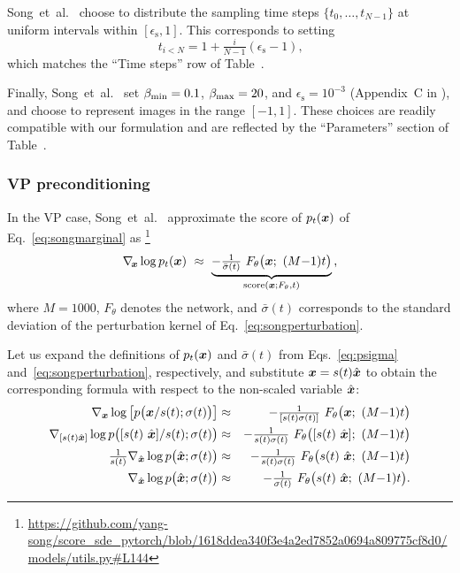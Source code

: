 Song~et~al.~\cite{Song2021sde} choose to distribute the sampling time steps $\{t_0, \dots, t_{N-1}\}$ at uniform intervals within $[\epsilon_\text{s}, 1]$.
This corresponds to setting
\begin{equation}
  t_{i<N} = 1 + \tfrac{i}{N-1}(\epsilon_\text{s} - 1)
  \text{,}
\end{equation}
which matches the ``Time steps'' row of Table~.

Finally, Song~et~al.~\cite{Song2021sde} set $\beta_\text{min} = 0.1$, $\beta_\text{max} = 20$, and $\epsilon_\text{s} = 10^{-3}$ (Appendix~C in \cite{Song2021sde}), and choose to represent images in the range $[-1, 1]$.
These choices are readily compatible with our formulation and are reflected by the ``Parameters'' section of Table~.

\subsubsection{VP preconditioning}

In the VP case, Song~et~al.~\cite{Song2021sde} approximate the score of $p_t(\boldsymbol{x})$ of Eq.~\ref{eq:songmarginal} as%
\footnote{\tiny\url{https://github.com/yang-song/score\_sde\_pytorch/blob/1618ddea340f3e4a2ed7852a0694a809775cf8d0/models/utils.py\#L144}}
\begin{equation}
  \nabla_{\hspace{-0.5mm}\boldsymbol{x}} \log p_t(\boldsymbol{x}) ~\approx~ \underbrace{{-}\tfrac{1}{\bar\sigma(t)} ~F_\theta\big( \boldsymbol{x}; ~(M{-}1)t \big)}_{\operatorname{score}(\boldsymbol{x}; F_\theta, t)}
  \label{eq:vpprecondorig}
  \text{,}
\end{equation}
where $M = 1000$, $F_\theta$ denotes the network, and $\bar\sigma(t)$ corresponds to the standard deviation of the perturbation kernel of Eq.~\ref{eq:songperturbation}.

Let us expand the definitions of $p_t(\boldsymbol{x})$ and $\bar\sigma(t)$ from Eqs.~\ref{eq:psigma} and~\ref{eq:songperturbation}, respectively, and substitute $\boldsymbol{x} = s(t) \hat{\boldsymbol{x}}$ to obtain the corresponding formula with respect to the non-scaled variable $\hat{\boldsymbol{x}}$:
\begin{eqnarray}
  \nabla_{\boldsymbol{x}} \log \big[ p\big( \boldsymbol{x} / s(t); \sigma(t) \big) \big] &\approx& {-}\tfrac{1}{[s(t) \sigma(t)]} ~F_\theta\big( \boldsymbol{x}; ~(M{-}1)t \big) \\
  \nabla_{[s(t) \hat{\boldsymbol{x}}]} \log p\big( [s(t) ~\hat{\boldsymbol{x}}] / s(t); \sigma(t) \big) &\approx& {-}\tfrac{1}{s(t) \sigma(t)} ~F_\theta\big( [s(t) ~\hat{\boldsymbol{x}}]; ~(M{-}1)t \big) \\
  \tfrac{1}{s(t)} \nabla_{\hat{\boldsymbol{x}}} \log p\big( \hat{\boldsymbol{x}}; \sigma(t) \big) &\approx& {-}\tfrac{1}{s(t) \sigma(t)} ~F_\theta\big( s(t) ~\hat{\boldsymbol{x}}; ~(M{-}1)t \big) \\
  \nabla_{\hat{\boldsymbol{x}}} \log p\big( \hat{\boldsymbol{x}}; \sigma(t) \big) &\approx& {-}\tfrac{1}{\sigma(t)} ~F_\theta\big( s(t) ~\hat{\boldsymbol{x}}; ~(M{-}1)t \big)
  \text{.}
\end{eqnarray}

